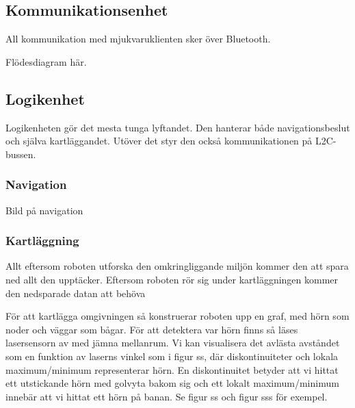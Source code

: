\documentclass{article}
\begin{document}
\subsection{Kommunikationsenhet}
All kommunikation med mjukvaruklienten sker över Bluetooth.

Flödesdiagram här.

\subsection{Logikenhet}
Logikenheten gör det mesta tunga lyftandet. Den hanterar både navigationsbeslut och själva kartläggandet. Utöver det styr den också kommunikationen på L2C-bussen.

\subsubsection{Navigation}
Bild på navigation

\subsubsection{Kartläggning}

Allt eftersom roboten utforska den omkringliggande miljön kommer den att spara ned allt den upptäcker. Eftersom roboten rör sig under kartläggningen kommer den nedsparade datan att behöva

För att kartlägga omgivningen så konstruerar roboten upp en graf, med hörn som noder och väggar som bågar. För att detektera var hörn finns så läses lasersensorn av med jämna mellanrum. Vi kan visualisera det avlästa avståndet som en funktion av laserns vinkel som i figur ss, där diskontinuiteter och lokala maximum/minimum representerar hörn. En diskontinuitet betyder att vi hittat ett utstickande hörn med golvyta bakom sig och ett lokalt maximum/minimum innebär att vi hittat ett hörn på banan. Se figur ss och figur sss för exempel.
\end{document}

